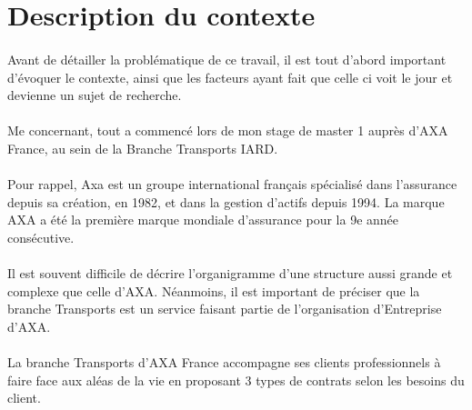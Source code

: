 \documentclass[12pt, a4paper, oneside]{book}
\begin{document}
\section{Description du contexte}

\paragraph{}

Avant de détailler la problématique de ce travail, il est tout d'abord important d'évoquer le contexte, ainsi que les facteurs ayant fait que celle ci voit le jour et devienne un sujet de recherche.

\paragraph{}

Me concernant, tout a commencé lors de mon stage de master 1 auprès d'AXA France, au sein de la Branche Transports IARD.


\paragraph{}

Pour rappel, Axa est un groupe international français spécialisé dans l'assurance depuis sa création, en 1982, et dans la gestion d'actifs depuis 1994. La marque AXA a été la première marque mondiale d'assurance pour la 9e année consécutive.


\paragraph{}

Il est souvent difficile de décrire l'organigramme d'une structure aussi
grande et complexe que celle d'AXA. Néanmoins, il est important de préciser que la branche Transports est un service faisant partie de l'organisation d'Entreprise d'AXA.

\paragraph{}

La branche Transports d'AXA France accompagne ses clients professionnels à faire face aux aléas de la vie en proposant 3 types de contrats selon les besoins du client.


\paragraph{}
\end{document}
